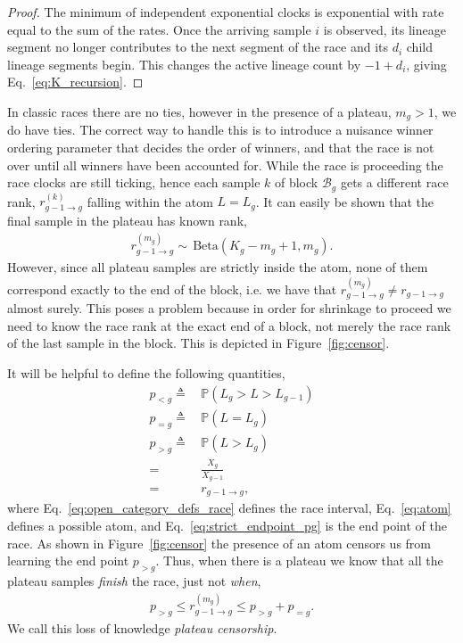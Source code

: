 \documentclass[pdflatex,sn-basic,icol]{sn-jnl}
\newcommand{\Prob}{\mathbb{P}}
\theoremstyle{plain}
\theoremstyle{definition}
\begin{document}
\begin{proof}
The minimum of independent exponential clocks is exponential with rate equal to the sum of the rates.
Once the arriving sample $i$ is observed, its lineage segment no longer contributes to the next segment of the race and its $d_i$ child lineage segments begin.
This changes the active lineage count by $-1+d_i$, giving Eq.~\ref{eq:K_recursion}.
\end{proof}

In classic races there are no ties, however in the presence of a plateau, $m_g>1$, we do have ties.
The correct way to handle this is to introduce a nuisance winner ordering parameter that decides the order of winners, and that the race is not over until all winners have been accounted for.
While the race is proceeding the race clocks are still ticking, hence each sample $k$ of block $\mathcal{B}_g$ gets a different race rank, $r^{(k)}_{g-1 \to g}$ falling within the atom $L = L_g$.
It can easily be shown that the final sample in the plateau has known rank,
\begin{align}
    r^{(m_g)}_{g-1 \to g} \sim\, \mathrm{Beta}(K_g - m_g + 1, m_g).\label{eq:end_block_dist}
\end{align}
However, since all plateau samples are strictly inside the atom, none of them correspond exactly to the end of the block, i.e. we have that $r^{(m_g)}_{g-1 \to g} \neq r_{g-1 \to g}$ almost surely.
This poses a problem because in order for shrinkage to proceed we need to know the race rank at the exact end of a block, not merely the race rank of the last sample in the block.
This is depicted in Figure~\ref{fig:censor}.

It will be helpful to define the following quantities,
\begin{align}
    p_{<g} \triangleq&\, \Prob(L_g > L > L_{g-1})\label{eq:open_category_defs_race}\\
    p_{=g} \triangleq&\, \Prob(L = L_g)\label{eq:atom}\\
    p_{>g} \triangleq&\, \Prob(L > L_g) \label{eq:strict_endpoint_pg} \\
    =&\, \frac{X_g}{X_{g-1}}\\
    =&\,r_{g-1 \to g},
\end{align}
where Eq.~\ref{eq:open_category_defs_race} defines the race interval, Eq.~\ref{eq:atom} defines a possible atom, and Eq.~\ref{eq:strict_endpoint_pg} is the end point of the race.
As shown in Figure~\ref{fig:censor} the presence of an atom censors us from learning the end point $p_{>g}$.
Thus, when there is a plateau we know that all the plateau samples \textit{finish} the race, just not \textit{when},
\begin{align}
    p_{>g} \le r^{(m_g)}_{g-1 \to g} \le p_{>g} + p_{=g}.
\end{align}
We call this loss of knowledge \textit{plateau censorship}.
\end{document}
